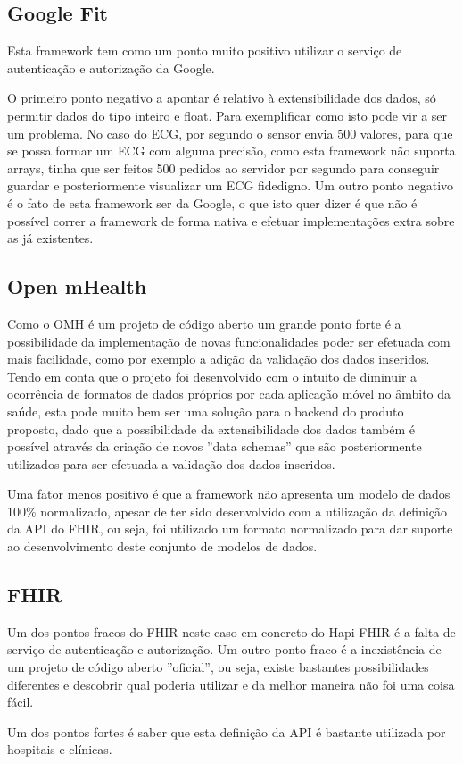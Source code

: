 \subsection{Google Fit}
Esta framework tem como um ponto muito positivo utilizar o serviço de autenticação e autorização da Google.\par 
O primeiro ponto negativo a apontar é relativo à extensibilidade dos dados, só permitir dados do tipo inteiro e float. Para exemplificar como isto pode vir a ser um problema. No caso do \gls{ECG}, por segundo o sensor envia 500 valores, para que se possa formar um \gls{ECG} com alguma precisão, como esta framework não suporta arrays, tinha que ser feitos 500 pedidos ao servidor por segundo para conseguir guardar e posteriormente visualizar um \gls{ECG} fidedigno. Um outro ponto negativo é o fato de esta framework ser da Google, o que isto quer dizer é que não é possível correr a framework de forma nativa e efetuar implementações extra sobre as já existentes.
\subsection{Open mHealth}
Como o \gls{OMH} é um projeto de código aberto um grande ponto forte é a possibilidade da implementação de novas funcionalidades poder ser efetuada com mais facilidade, como por exemplo a adição da validação dos dados inseridos. Tendo em conta que o projeto foi desenvolvido com o intuito de diminuir a ocorrência de formatos de dados próprios por cada aplicação móvel no âmbito da saúde, esta pode muito bem ser uma solução para o backend do produto proposto, dado que a possibilidade da extensibilidade dos dados também é possível através da criação de novos ''data schemas'' que são posteriormente utilizados para ser efetuada a validação dos dados inseridos.
\par
Uma fator menos positivo é que a framework não apresenta um modelo de dados 100\% normalizado, apesar de ter sido desenvolvido com a utilização da definição da \gls{API} do \gls{FHIR}, ou seja, foi utilizado um formato normalizado para  dar suporte ao desenvolvimento deste conjunto de modelos de dados.
\subsection{FHIR}

Um dos pontos fracos do FHIR neste caso em concreto do Hapi-FHIR é a falta de serviço de autenticação e autorização. Um outro ponto fraco é a inexistência de um projeto de código aberto ''oficial'', ou seja, existe bastantes possibilidades diferentes e descobrir qual poderia utilizar e da melhor maneira não foi uma coisa fácil.
\par
Um dos pontos fortes é saber que esta definição da \gls{API} é bastante utilizada por hospitais e clínicas.
